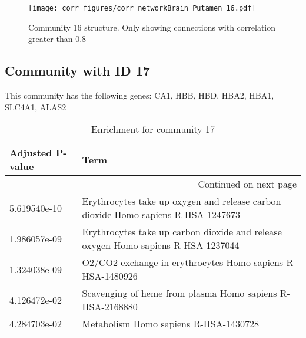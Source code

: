 \begin{figure}[h!]
\centering
\texttt{[image: corr\_figures/corr\_networkBrain\_Putamen\_16.pdf]}
\caption{Community 16 structure. Only showing connections with correlation greater than 0.8}
\end{figure}




\subsection*{Community with ID 17}
This community has the following genes: CA1, HBB, HBD, HBA2, HBA1, SLC4A1, ALAS2
\\
\begin{longtable}{p{2.4cm}p{14.5cm}}
\caption{Enrichment for community 17}\\
\toprule
Adjusted \newline P-value &                                                                               Term \\
\midrule
\endhead
\midrule
\multicolumn{2}{r}{{Continued on next page}} \\
\midrule
\endfoot

\bottomrule
\endlastfoot
             5.619540e-10 &  Erythrocytes take up oxygen and release carbon dioxide Homo sapiens R-HSA-1247673 \\
             1.986057e-09 &  Erythrocytes take up carbon dioxide and release oxygen Homo sapiens R-HSA-1237044 \\
             1.324038e-09 &                         O2/CO2 exchange in erythrocytes Homo sapiens R-HSA-1480926 \\
             4.126472e-02 &                          Scavenging of heme from plasma Homo sapiens R-HSA-2168880 \\
             4.284703e-02 &                                              Metabolism Homo sapiens R-HSA-1430728 \\
\end{longtable}


